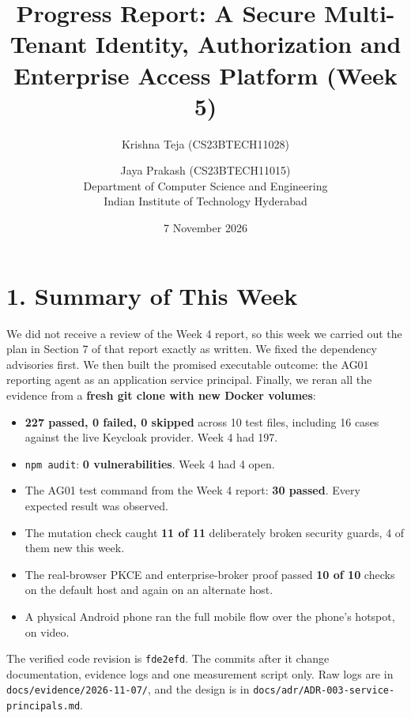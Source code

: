 \documentclass{article}
\title{\textbf{Progress Report: A Secure Multi-Tenant Identity, Authorization and Enterprise Access Platform (Week 5)}}
\author{Krishna Teja (CS23BTECH11028) \and Jaya Prakash (CS23BTECH11015) \\ Department of Computer Science and Engineering \\ Indian Institute of Technology Hyderabad}
\date{7 November 2026}
\begin{document}
\maketitle

\section*{1. Summary of This Week}
We did not receive a review of the Week 4 report, so this week we carried out the plan in Section 7 of that report exactly as written. We fixed the dependency advisories first. We then built the promised executable outcome: the AG01 reporting agent as an application service principal. Finally, we reran all the evidence from a \textbf{fresh git clone with new Docker volumes}:

\begin{itemize}
    \item \textbf{227 passed, 0 failed, 0 skipped} across 10 test files, including 16 cases against the live Keycloak provider. Week 4 had 197.
    \item \texttt{npm audit}: \textbf{0 vulnerabilities}. Week 4 had 4 open.
    \item The AG01 test command from the Week 4 report: \textbf{30 passed}. Every expected result was observed.
    \item The mutation check caught \textbf{11 of 11} deliberately broken security guards, 4 of them new this week.
    \item The real-browser PKCE and enterprise-broker proof passed \textbf{10 of 10} checks on the default host and again on an alternate host.
    \item A physical Android phone ran the full mobile flow over the phone's hotspot, on video.
\end{itemize}

The verified code revision is \texttt{fde2efd}. The commits after it change documentation, evidence logs and one measurement script only. Raw logs are in \texttt{docs/evidence/2026-11-07/}, and the design is in \texttt{docs/adr/ADR-003-service-principals.md}.
\end{document}
